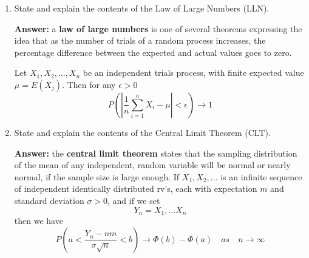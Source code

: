 \documentclass[letterpaper,12pt]{article}
\begin{document}
\begin{enumerate}
  \item State and explain the contents of the Law of Large Numbers (LLN).
    \begin{tcolorbox}
    \textbf{Answer:}
    a \textbf{law of large numbers} is one of several theorems expressing the idea that as the number of trials of a random process increases, the percentage difference between the expected and actual values goes to zero.
    
    Let $X_{1}, X_{2}, ..., X_{n}$ be an independent trials process, with finite expected value $\mu = E(X_{j})$. Then for any $\epsilon > 0$
    \begin{equation*}
        P\left( \left| \frac{1}{n} \sum_{i=1}^{n} X_{i} - \mu \right | < \epsilon \right) \rightarrow 1
    \end{equation*}
    \end{tcolorbox}
  \item  State and explain the contents of the Central Limit Theorem (CLT).
    \begin{tcolorbox}
    \textbf{Answer:}
    the \textbf{central limit theorem} states that the sampling distribution of the mean of any independent, random variable will be normal or nearly normal, if the sample size is large enough.
    If $X_{1}, X_{2}, ...$ is an infinite sequence of independent identically distributed rv's, each with expectation $m$ and standard deviation $\sigma > 0$, and if we set
    \begin{equation*}
        Y_{n} = X_{1}, ... X_{n}
    \end{equation*}
    then we have
    \begin{equation*}
        P\left( a < \frac{Y_{n} - nm}{\sigma \sqrt{n}} < b\right) \rightarrow \Phi(b) - \Phi(a) \quad as \quad n \rightarrow \infty
    \end{equation*}
    \end{tcolorbox}
\end{enumerate}
\end{document}
